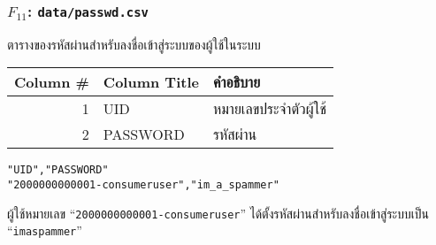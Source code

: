 \vspace{3\baselineskip}


\begin{minipage}{\textwidth}
\subsubsection{\texorpdfstring{$ F_{11} $}{File \#11}: \texttt{data/passwd.csv}}\label{subsubsec:csv-f11}

ตารางของรหัสผ่านสำหรับลงชื่อเข้าสู่ระบบของผู้ใช้ในระบบ

\begin{tabular}[!hbt]{| r | >{\ttfamily}p{15ex}<{\rmfamily} | p{36ex} |}
\hline
Column \#       & \rmfamily Column Title                & คำอธิบาย\\
\hline
1               & UID                                   & หมายเลขประจำตัวผู้ใช้\\
2               & PASSWORD                              & รหัสผ่าน\\
\hline
\end{tabular}


\begin{lstlisting}[caption={\texttt{data/passwd.csv}}]
"UID","PASSWORD"
"2000000000001-consumeruser","im_a_spammer"
\end{lstlisting}

\begin{description}[labelwidth=*]
    \item[$ \Rightarrow $] ผู้ใช้หมายเลข ``\texttt{2000000000001-consumeruser}''
ได้ตั้งรหัสผ่านสำหรับลงชื่อเข้าสู่ระบบเป็น ``\texttt{im\textunderscore{}a\textunderscore{}spammer}''
\end{description}
\end{minipage}


\vspace{3\baselineskip}


